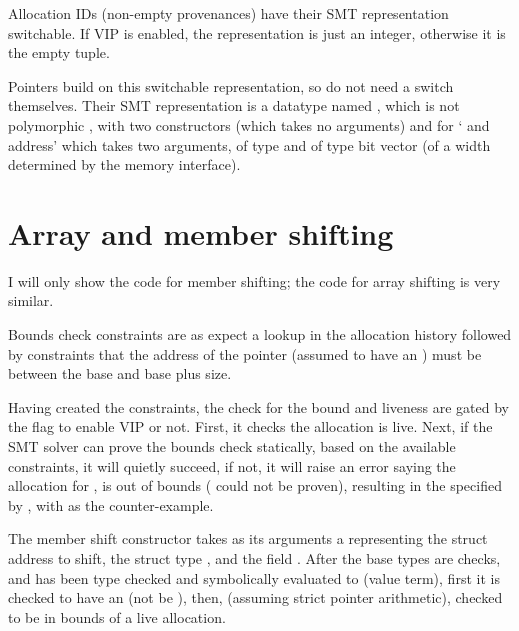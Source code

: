 Allocation IDs (non-empty provenances) have their SMT representation
switchable. If VIP is enabled, the representation is just an integer, otherwise
it is the empty tuple.


Pointers build on this switchable representation, so do not need a switch
themselves. Their SMT representation is a datatype named
, which is not polymorphic \ocamlinline{[]}, with two %
constructors  (which takes no arguments) and
 for ` and address' which takes two arguments,
 of type  and %
 of type bit vector (of a width determined by the memory %
interface).


\section{Array and member shifting}

I will only show the code for member shifting; the code for array shifting is
very similar.

Bounds check constraints are as expect \textemdash{} a lookup in the
allocation history followed by constraints that the address of the pointer
(assumed to have an ) must be between the base and base plus
size.


Having created the constraints, the check for the bound and liveness are gated
by the flag to enable VIP or not. First, it checks the allocation is live.
Next, if the SMT solver can prove the bounds check statically, based on the
available constraints, it will quietly succeed, if not, it will raise an error
saying the allocation for , is out of bounds
( could not be proven), resulting in the  specified
by , with  as the counter-example.


The member shift constructor takes as its arguments a 
representing the struct address to shift, the struct type ,
and the field . After the base types are checks, and
 has been type checked and symbolically evaluated to
 (value term), first it is checked to have an 
(not be ), then, (assuming strict pointer arithmetic), checked to
be in bounds of a live allocation.

